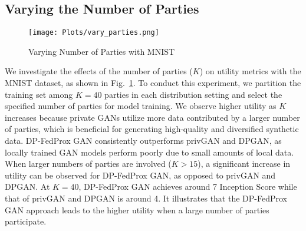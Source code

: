 \documentclass[conference]{IEEEtran}
\begin{document}
\subsection{Varying the Number of Parties}

\begin{figure}[t]
 \centering
 \texttt{[image: Plots/vary\_parties.png]}
	\caption{Varying Number of Parties with MNIST}
 \label{fig:IncreaseClients}
\end{figure}


We investigate the effects of the number of parties ($K$) on utility metrics with the MNIST dataset, as shown in Fig.~\ref{fig:IncreaseClients}. To conduct this experiment, we partition the training set among $K=40$ parties in each distribution setting and select the specified number of parties for model training. We observe higher utility as $K$ increases because private GANs utilize more data contributed by a larger number of parties, which is beneficial for generating high-quality and diversified synthetic data.  DP-FedProx GAN consistently outperforms privGAN and DPGAN, as locally trained GAN models perform poorly due to small amounts of local data.   When larger numbers of parties are involved ($K > 15$),  a significant increase in utility can be observed for DP-FedProx GAN, as opposed to privGAN and DPGAN.  At $K=40$, DP-FedProx GAN achieves around 7 Inception Score while that of privGAN and DPGAN is around 4. It illustrates that the DP-FedProx GAN approach leads to the higher utility when a large number of parties participate. %






\end{document}
